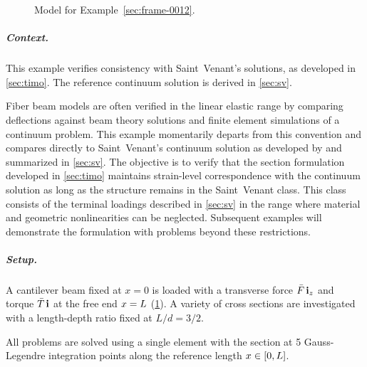 \begin{figure}[H]
    \centering
    \caption{Model for Example~\ref{sec:frame-0012}.}
    \label{fig:frame-0012-setup}
\end{figure}

\subparagraph{Context.}
This example verifies consistency with Saint~Venant's solutions, as developed in \cref{sec:timo}. 
The reference continuum solution is derived in \cref{sec:sv}. 

Fiber beam models are often verified in the linear elastic range by comparing deflections against beam theory solutions \citep[5.2.1]{saritas2006mixed} and finite element simulations of a continuum problem. 
This example momentarily departs from this convention and compares directly to Saint~Venant's continuum solution as developed by \cite{iesan1986saintvenants} and summarized in \cref{sec:sv}. 
The objective is to verify that the section formulation developed in \cref{sec:timo} maintains strain-level correspondence with the continuum solution as long as the structure remains in the Saint~Venant class. 
This class consists of the terminal loadings described in \cref{sec:sv} in the range where material and geometric nonlinearities can be neglected. 
Subsequent examples will demonstrate the formulation with problems beyond these restrictions. 

\subparagraph{Setup.}
A cantilever beam fixed at $x=0$ is loaded with a transverse force $\bar{F}\,\mathbf{i}_z$ and torque $\bar{T}\,\mathbf{i}$ at the free end $x=L$ (\cref{fig:frame-0012-setup}).
A variety of cross sections are investigated with a length-depth ratio fixed at $L/d = 3/2$. 

All problems are solved using a single \ForceFrame{} element with the \ShearFiber{} section at 5 Gauss-Legendre integration points along the reference length \(x\in [0,L]\). 



